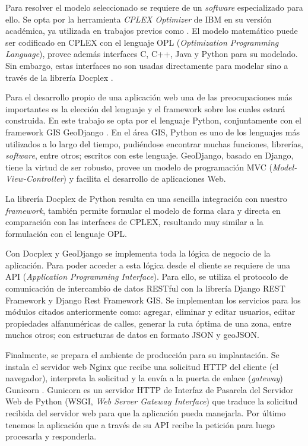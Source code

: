 \documentclass[spanish, conference]{IEEEtran}
\begin{document}
Para resolver el modelo seleccionado se requiere de un \textit{software} especializado para ello. Se opta por la herramienta \textit{CPLEX Optimizer} de IBM \cite{CPLEXOptimizer} en su versión académica, ya utilizada en trabajos previos como \cite{Vecchi2016ACollection,Ramos2018TheApproaches,BabaeeTirkolaee2019DevelopingStudy}. El modelo matemático puede ser codificado en CPLEX con el lenguaje OPL ({\textit{Optimization Programming Language}}), provee además interfaces C, C++, Java y Python para su modelado. Sin embargo, estas interfaces no son usadas directamente para modelar sino a través de la librería Docplex \cite{Docplex}.

Para el desarrollo propio de una aplicación web una de las preocupaciones más importantes es la elección del lenguaje y el framework sobre los cuales estará construida. En este trabajo se opta por el lenguaje Python, conjuntamente con el framework GIS GeoDjango \cite{GeoDjango}. En el área GIS, Python es uno de los lenguajes más utilizados a lo largo del tiempo, pudiéndose encontrar muchas funciones, librerías, \textit{software}, entre otros; escritos con este lenguaje. GeoDjango, basado en Django, tiene la virtud de ser robusto, provee un modelo de programación MVC (\textit{Model-View-Controller}) y facilita el desarrollo de aplicaciones Web.

La librería Docplex de Python resulta en una sencilla integración con nuestro \textit{framework}, también permite formular el modelo de forma clara y directa en comparación con las interfaces de CPLEX, resultando muy similar a la formulación con el lenguaje OPL.

Con Docplex y GeoDjango se implementa toda la lógica de negocio de la aplicación. Para poder acceder a esta lógica desde el cliente se requiere de una API (\textit{Application Programming Interface}). Para ello, se utiliza el protocolo de comunicación de intercambio de datos RESTful con la librería Django REST Framework y Django Rest Framework GIS. Se implementan los servicios para los módulos citados anteriormente como: agregar, eliminar y editar usuarios, editar propiedades alfanuméricas de calles, generar la ruta óptima de una zona, entre muchos otros; con estructuras de datos en formato JSON y geoJSON.

Finalmente, se prepara el ambiente de producción para su implantación. Se instala el servidor web Nginx \cite{NGINX} que recibe una solicitud HTTP del cliente (el navegador), interpreta la solicitud y la envía a la puerta de enlace (\textit{gateway}) Gunicorn \cite{Gunicorn}. Gunicorn es un servidor HTTP de Interfaz de Pasarela del Servidor Web de Python (WSGI, \textit{Web Server Gateway Interface}) que traduce la solicitud recibida del servidor web para que la aplicación pueda manejarla. Por último tenemos la aplicación que a través de su API recibe la petición para luego procesarla y responderla.
\end{document}
